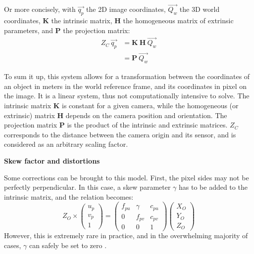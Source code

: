 Or more concisely, with $\overrightarrow{q_p}$ the 2D image coordinates, $\overrightarrow{Q_w}$ the 3D world coordinates, $\textbf{K}$ the intrinsic matrix, $\textbf{H}$ the homogeneous matrix of extrinsic parameters, and $\textbf{P}$ the projection matrix:
\begin{equation}\label{eq:pinhole_short}
  \boxed{
  \begin{aligned}
  Z_C \ \overrightarrow{q_p} &= \textbf{K} \ \textbf{H} \ \overrightarrow{Q_w}\\
  &= \textbf{P} \ \overrightarrow{Q_w}
  \end{aligned}
  }
\end{equation}

To sum it up, this system allows for a transformation between the coordinates of an object in meters in the world reference frame, and its coordinates in pixel on the image. It is a linear system, thus not computationally intensive to solve. The intrinsic matrix $\textbf{K}$ is constant for a given camera, while the homogeneous (or extrinsic) matrix $\textbf{H}$ depends on the camera position and orientation. The projection matrix $\textbf{P}$ is the product of the intrinsic and extrinsic matrices. $Z_C$ corresponds to the distance between the camera origin and its sensor, and is considered as an arbitrary scaling factor.


\vspace*{0.5cm}
\noindent\textbf{Skew factor and distortions}

Some corrections can be brought to this model. First, the pixel sides may not be perfectly perpendicular. In this case, a skew parameter $\gamma$ has to be added to the intrinsic matrix, and the relation becomes:
\begin{equation}
  Z_O \times \begin{pmatrix}u_p\\v_p\\1\end{pmatrix} = \begin{pmatrix}f_{pu} & \gamma & c_{pu} \\ 0 & f_{pv} & c_{pv} \\ 0&0&1\end{pmatrix}\begin{pmatrix}X_O\\Y_O\\Z_O\end{pmatrix}
\end{equation}
However, this is extremely rare in practice, and in the overwhelming majority of cases, $\gamma$
can safely be set to zero \cite{Zhang2000}.


